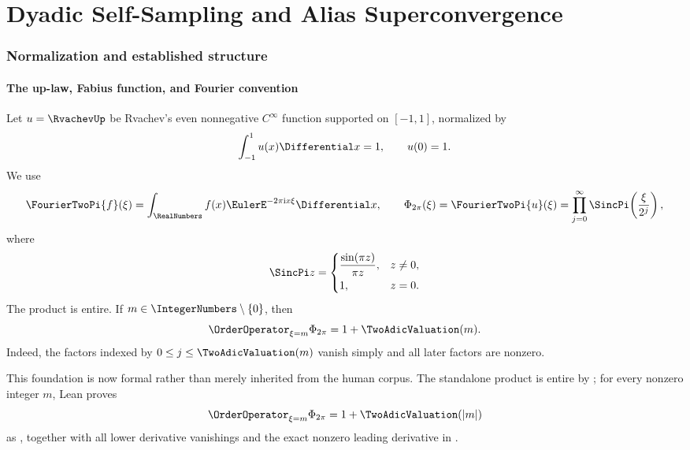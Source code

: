 
\part{Dyadic Self-Sampling and Alias Superconvergence}


\section{Normalization and established structure}
\label{is:p3:sec:background}

\subsection{The up-law, Fabius function, and Fourier convention}

Let $u=\RvachevUp$ be Rvachev's even nonnegative $C^\infty$ function supported on $[-1,1]$, normalized by
\[
 \int_{-1}^{1}u(x)\Differential x=1,
 \qquad u(0)=1.
\]
We use
\begin{equation}
 \FourierTwoPi{f}(\xi)=\int_{\RealNumbers}f(x)\EulerE^{-2\pi\iu x\xi}\Differential x,
 \qquad
 \PhiCyc(\xi)=\FourierTwoPi{u}(\xi)
 =\prod_{j=0}^{\infty}\SincPi\!\left(\frac{\xi}{2^j}\right),
 \label{is:p3:eq:Phi-product}
\end{equation}
where
\[
 \SincPi z=\begin{cases}\dfrac{\sin(\pi z)}{\pi z},&z\ne0,\\[0.4em]1,&z=0.\end{cases}
\]
The product is entire.  If $m\in\IntegerNumbers\setminus\{0\}$, then
\begin{equation}
 \OrderOperator_{\xi=m}\PhiCyc=1+\TwoAdicValuation(m).
 \label{is:p3:eq:integer-multiplicity}
\end{equation}
Indeed, the factors indexed by $0\le j\le\TwoAdicValuation(m)$ vanish simply and all later factors are nonzero.

This foundation is now formal rather than merely inherited from the human
corpus.  The standalone product is entire by
; for every nonzero
integer \(m\), Lean proves
\[
 \OrderOperator_{\xi=m}\PhiCyc=1+\TwoAdicValuation(|m|)
\]
as , together with
all lower derivative vanishings and the exact nonzero leading derivative
in .

